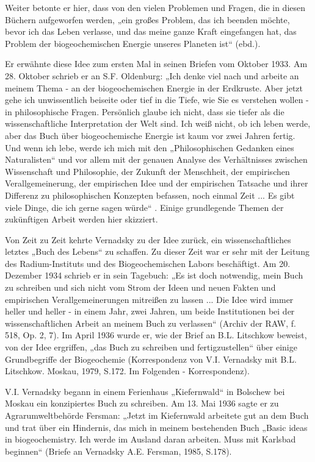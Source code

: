 \documentclass[11pt,a4paper]{article}
\begin{document}
Weiter betonte er hier, dass von den vielen Problemen und Fragen, die in
diesen Büchern aufgeworfen werden, „ein großes Problem, das ich beenden
möchte, bevor ich das Leben verlasse, und das meine ganze Kraft eingefangen
hat, das Problem der biogeochemischen Energie unseres Planeten ist“ (ebd.).

Er erwähnte diese Idee zum ersten Mal in seinen Briefen vom Oktober 1933. Am
28. Oktober schrieb er an S.F. Oldenburg: „Ich denke viel nach und arbeite an
meinem Thema - an der biogeochemischen Energie in der Erdkruste. Aber jetzt
gehe ich unwissentlich beiseite oder tief in die Tiefe, wie Sie es verstehen
wollen - in philosophische Fragen. Persönlich glaube ich nicht, dass sie
tiefer als die wissenschaftliche Interpretation der Welt sind. Ich weiß nicht,
ob ich leben werde, aber das Buch über biogeochemische Energie ist kaum vor
zwei Jahren fertig. Und wenn ich lebe, werde ich mich mit den „Philosophischen
Gedanken eines Naturalisten“ und vor allem mit der genauen Analyse des
Verhältnisses zwischen Wissenschaft und Philosophie, der Zukunft der
Menschheit, der empirischen Verallgemeinerung, der empirischen Idee und der
empirischen Tatsache und ihrer Differenz zu philosophischen Konzepten
befassen, noch einmal Zeit ... Es gibt viele Dinge, die ich gerne sagen würde“
\cite[S. 76]{Rosov1993}. Einige grundlegende Themen der zukünftigen Arbeit
werden hier skizziert.
  
Von Zeit zu Zeit kehrte Vernadsky zu der Idee zurück, ein wissenschaftliches
letztes „Buch des Lebens“ zu schaffen. Zu dieser Zeit war er sehr mit der
Leitung des Radium-Instituts und des Biogeochemischen Labors beschäftigt. Am
20. Dezember 1934 schrieb er in sein Tagebuch: „Es ist doch notwendig, mein
Buch zu schreiben und sich nicht vom Strom der Ideen und neuen Fakten und
empirischen Verallgemeinerungen mitreißen zu lassen ... Die Idee wird immer
heller und heller - in einem Jahr, zwei Jahren, um beide Institutionen bei der
wissenschaftlichen Arbeit an meinem Buch zu verlassen“ (Archiv der RAW,
f. 518, Op. 2, 7). Im April 1936 wurde er, wie der Brief an B.L. Litschkow
beweist, von der Idee ergriffen, „das Buch zu schreiben und fertigzustellen“
über einige Grundbegriffe der Biogeochemie (Korrespondenz von V.I. Vernadsky
mit B.L. Litschkow. Moskau, 1979, S.172. Im Folgenden - Korrespondenz).

V.I. Vernadsky begann in einem Ferienhaus „Kiefernwald“ in Bolschew bei Moskau
ein konzipiertes Buch zu schreiben. Am 13. Mai 1936 sagte er zu
Agrarumweltbehörde Fersman: „Jetzt im Kiefernwald arbeitete gut an dem Buch
und trat über ein Hindernis, das mich in meinem bestehenden Buch „Basic ideas
in biogeochemistry. Ich werde im Ausland daran arbeiten. Muss mit Karlsbad
beginnen“ (Briefe an Vernadsky A.E. Fersman, 1985, S.178).
\end{document}

